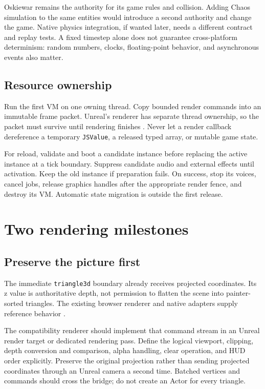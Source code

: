 \documentclass[10pt,letterpaper,twocolumn]{article}
\newcommand{\code}[1]{\texttt{\nolinkurl{#1}}}
\begin{document}
Oskiewar remains the authority for its game rules and collision. Adding Chaos simulation to the same entities would introduce a second authority and change the game. Native physics integration, if wanted later, needs a different contract and replay tests. A fixed timestep alone does not guarantee cross-platform determinism: random numbers, clocks, floating-point behavior, and asynchronous events also matter.

\subsection{Resource ownership}
Run the first VM on one owning thread. Copy bounded render commands into an immutable frame packet. Unreal's renderer has separate thread ownership, so the packet must survive until rendering finishes \citep{threading}. Never let a render callback dereference a temporary \code{JSValue}, a released typed array, or mutable game state.

For reload, validate and boot a candidate instance before replacing the active instance at a tick boundary. Suppress candidate audio and external effects until activation. Keep the old instance if preparation fails. On success, stop its voices, cancel jobs, release graphics handles after the appropriate render fence, and destroy its VM. Automatic state migration is outside the first release.

\section{Two rendering milestones}\label{sec:render}
\subsection{Preserve the picture first}
The immediate \code{triangle3d} boundary already receives projected coordinates. Its z value is authoritative depth, not permission to flatten the scene into painter-sorted triangles. The existing browser renderer and native adapters supply reference behavior \citep{split,player}.

The compatibility renderer should implement that command stream in an Unreal render target or dedicated rendering pass. Define the logical viewport, clipping, depth conversion and comparison, alpha handling, clear operation, and HUD order explicitly. Preserve the original projection rather than sending projected coordinates through an Unreal camera a second time. Batched vertices and commands should cross the bridge; do not create an Actor for every triangle.
\end{document}

